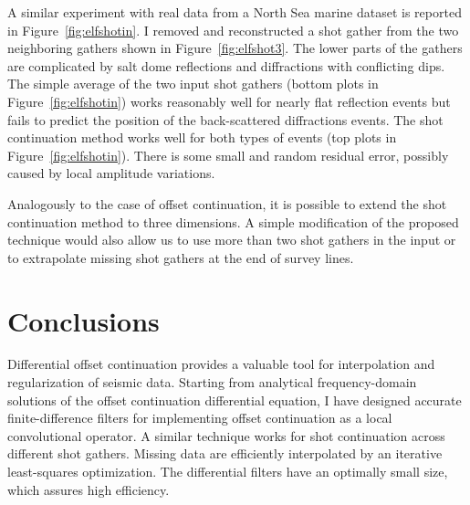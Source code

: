  
  A similar experiment with real data from a North Sea marine dataset
  is reported in Figure~\ref{fig:elfshotin}. I removed and
  reconstructed a shot gather from the two neighboring gathers shown
  in Figure~\ref{fig:elfshot3}. The lower parts of the gathers are
  complicated by salt dome reflections and diffractions with
  conflicting dips. The simple average of the two input shot gathers
  (bottom plots in Figure~\ref{fig:elfshotin}) works reasonably well
  for nearly flat reflection events but fails to predict the position
  of the back-scattered diffractions events. The shot continuation
  method works well for both types of events (top plots in
  Figure~\ref{fig:elfshotin}). There is some small and random residual
  error, possibly caused by local amplitude variations.
   
  
  
  Analogously to the case of offset continuation, it is possible to
  extend the shot continuation method to three dimensions. A simple
  modification of the proposed technique would also allow us to use
  more than two shot gathers in the input or to extrapolate missing
  shot gathers at the end of survey lines.


\section{Conclusions}

Differential offset continuation provides a valuable tool for
interpolation and regularization of seismic data. Starting from
analytical frequency-domain solutions of the offset continuation
differential equation, I have designed accurate finite-difference
filters for implementing offset continuation as a local convolutional
operator. A similar technique works for shot continuation across
different shot gathers. Missing data are efficiently interpolated by
an iterative least-squares optimization. The differential filters have
an optimally small size, which assures high efficiency.

